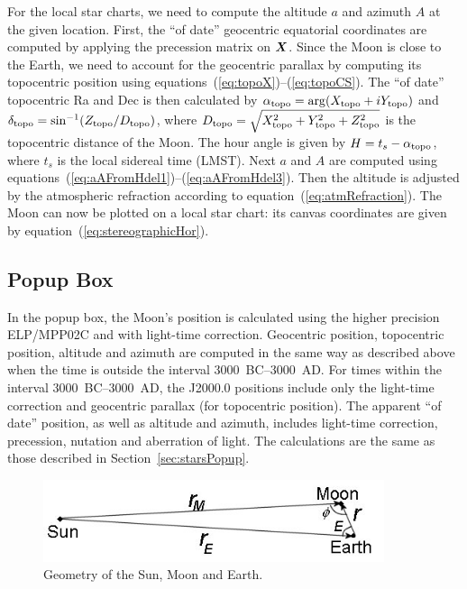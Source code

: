 \documentclass[12pt]{article}
\newcommand{\ve}[1]{\mbox{\boldmath $#1$}}
\begin{document}
For the local star charts, we need to compute the altitude $a$
and azimuth $A$ at the given location. First, the ``of date'' geocentric equatorial
coordinates are computed by applying the precession matrix on $\ve{X}$. 
Since the Moon is close to the Earth, we need to account for the geocentric 
parallax by computing its topocentric position using 
equations~(\ref{eq:topoX})--(\ref{eq:topoCS}). The ``of date'' topocentric Ra and Dec
is then calculated by $\alpha_{\rm topo} = {\rm arg}(X_{\rm topo}+iY_{\rm topo})$ and 
$\delta_{\rm topo}=\sin^{-1} (Z_{\rm topo}/D_{\rm topo})$, where 
$D_{\rm topo}=\sqrt{X_{\rm topo}^2 + Y_{\rm topo}^2 + Z_{\rm topo}^2}$ is 
the topocentric distance of the Moon.
The hour angle is given by $H=t_s-\alpha_{\rm topo}$, where $t_s$ is the local
sidereal time (LMST). Next $a$ and $A$ are computed using
equations~(\ref{eq:aAFromHdel1})--(\ref{eq:aAFromHdel3}). Then the altitude
is adjusted by the atmospheric refraction according to equation~(\ref{eq:atmRefraction}).
The Moon can now be plotted on a local star chart: its canvas coordinates are
given by equation~(\ref{eq:stereographicHor}).

\subsection{Popup Box}

In the popup box, the Moon's position is calculated using the higher precision 
ELP/MPP02C and with light-time correction. Geocentric position, topocentric 
position, altitude and azimuth are computed in the same way as described above when 
the time is outside the interval 3000~BC--3000~AD. For times within the interval 
3000~BC--3000~AD, the J2000.0 positions
include only the light-time correction and geocentric parallax (for topocentric
position). The apparent ``of date'' position, as well as altitude and azimuth,
includes light-time correction,
precession, nutation and aberration of light. The calculations are the same
as those described in Section~\ref{sec:starsPopup}.

\begin{figure}[h]
\begin{center}
\includegraphics[width=10cm]{sunEarthMoon.jpg}
\end{center}
\caption{Geometry of the Sun, Moon and Earth.}
\label{fig:SunMoonEarth}
\end{figure}
\end{document}
